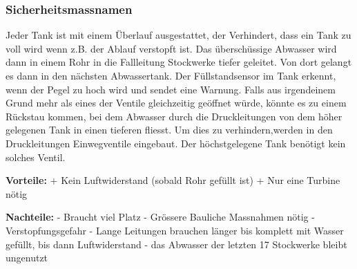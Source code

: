 \subsubsection{Sicherheitsmassnamen}
Jeder Tank ist mit einem Überlauf ausgestattet, der Verhindert, dass ein Tank zu voll wird wenn z.B. der Ablauf verstopft ist. Das überschüssige Abwasser wird dann in einem Rohr in die Fallleitung Stockwerke tiefer geleitet. Von dort gelangt es dann in den nächsten Abwassertank. Der Füllstandsensor im Tank erkennt, wenn der Pegel zu hoch wird und sendet eine Warnung.
Falls aus irgendeinem Grund mehr als eines der Ventile gleichzeitig geöffnet würde, könnte es zu einem Rückstau kommen, bei dem Abwasser durch die Druckleitungen von dem höher gelegenen Tank in einen tieferen fliesst. Um dies zu verhindern,werden in den Druckleitungen Einwegventile eingebaut. Der höchstgelegene Tank benötigt kein solches Ventil. 


\textbf{Vorteile:} 									\newline
+	Kein Luftwiderstand (sobald Rohr gefüllt ist)	\newline
+	Nur eine Turbine nötig							\newline

\textbf{Nachteile:}									\newline
-	Braucht viel Platz 								\newline
-	Grössere Bauliche Massnahmen nötig				\newline
-	Verstopfungsgefahr 								\newline
-	Lange Leitungen brauchen länger bis komplett mit Wasser gefüllt, bis dann Luftwiderstand
-	das Abwasser der letzten 17 Stockwerke bleibt ungenutzt